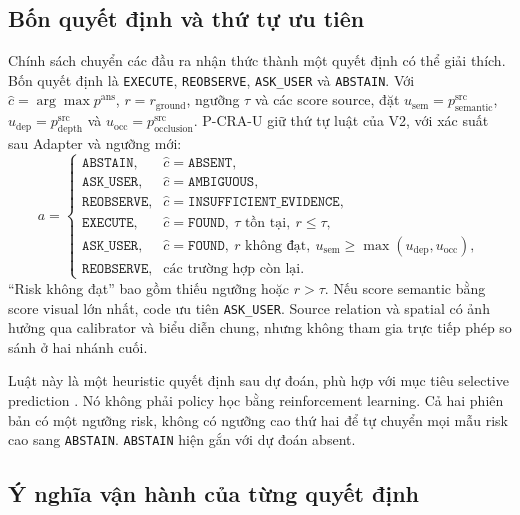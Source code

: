\subsection{Bốn quyết định và thứ tự ưu tiên}

Chính sách chuyển các đầu ra nhận thức thành một quyết định
có thể giải thích. Bốn quyết định là \texttt{EXECUTE},
\texttt{REOBSERVE}, \texttt{ASK\_USER} và \texttt{ABSTAIN}.
Với $\widehat{c}=\arg\max p^{\mathrm{ans}}$,
$r=r_{\mathrm{ground}}$, ngưỡng $\tau$ và các score source,
đặt $u_{\mathrm{sem}}=p_{\mathrm{semantic}}^{\mathrm{src}}$,
$u_{\mathrm{dep}}=p_{\mathrm{depth}}^{\mathrm{src}}$ và
$u_{\mathrm{occ}}=p_{\mathrm{occlusion}}^{\mathrm{src}}$.
P-CRA-U giữ thứ tự luật của V2, với xác suất sau Adapter và ngưỡng mới:
\begin{equation}
    a=
    \begin{cases}
        \texttt{ABSTAIN},
        &\widehat{c}=\texttt{ABSENT},\\
        \texttt{ASK\_USER},
        &\widehat{c}=\texttt{AMBIGUOUS},\\
        \texttt{REOBSERVE},
        &\widehat{c}=\texttt{INSUFFICIENT\_EVIDENCE},\\
        \texttt{EXECUTE},
        &\widehat{c}=\texttt{FOUND},\
        \tau\text{ tồn tại},\ r\leq\tau,\\
        \texttt{ASK\_USER},
        &\widehat{c}=\texttt{FOUND},\
        r\text{ không đạt},\
        u_{\mathrm{sem}}\geq\max(u_{\mathrm{dep}},u_{\mathrm{occ}}),\\
        \texttt{REOBSERVE},&\text{các trường hợp còn lại}.
    \end{cases}
    \label{eq:method-policy}
\end{equation}
“Risk không đạt” bao gồm thiếu ngưỡng hoặc $r>\tau$.
Nếu score semantic bằng score visual lớn nhất, code ưu
tiên \texttt{ASK\_USER}. Source relation và spatial có
ảnh hưởng qua calibrator và biểu diễn chung, nhưng không
tham gia trực tiếp phép so sánh ở hai nhánh cuối.

Luật này là một heuristic quyết định sau dự đoán, phù hợp
với mục tiêu selective prediction \cite{geifman2017selective}.
Nó không phải policy học bằng reinforcement learning.
Cả hai phiên bản có một ngưỡng risk, không có ngưỡng cao thứ hai để tự
chuyển mọi mẫu risk cao sang \texttt{ABSTAIN}.
\texttt{ABSTAIN} hiện gắn với dự đoán absent.

\subsection{Ý nghĩa vận hành của từng quyết định}

